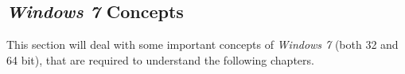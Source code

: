 \subsection{\emph{Windows 7} Concepts}
This section will deal with some important concepts of \emph{Windows 7} (both 32 and 64 bit), that are required to understand the following chapters.


